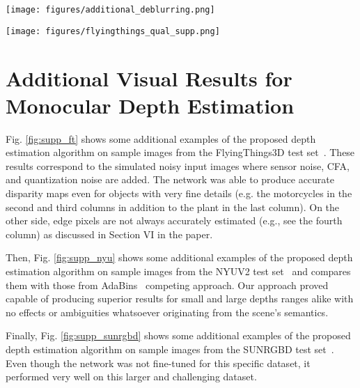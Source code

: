 \documentclass[preprint,5p,twocolumn]{elsarticle}
\begin{document}
\begin{figure*}[h!]
\centering
\texttt{[image: figures/additional\_deblurring.png]}
\caption{Additional qualitative results of the image deblurring model on the test set of FlyingThings3D~\cite{MIFDB16} subset.}
\label{fig:add_deblur_supp}
\end{figure*}



\begin{figure*}[h!]
\centering
\captionsetup{justification=centering}
\texttt{[image: figures/flyingthings\_qual\_supp.png]}
\caption{Additional qualitative results on RPSF-blurred images from the test set of FlyingThings3D~\cite{MIFDB16} subset.}
\label{fig:supp_ft}
\end{figure*}

\section{Additional Visual Results for Monocular Depth Estimation}
\label{sec:res2}


Fig. \ref{fig:supp_ft} shows some additional examples of the proposed depth estimation algorithm on  sample images from the  FlyingThings3D test set~\cite{MIFDB16}. These results correspond to the simulated noisy input images where sensor noise, CFA, and quantization noise are added. The network was able to produce accurate disparity maps even for objects with very fine details (e.g. the motorcycles in the second and third columns in addition to the plant in the last column). On the other side, edge pixels are not always accurately estimated (e.g., see the fourth column) as discussed in Section VI in the paper.

Then, Fig. \ref{fig:supp_nyu} shows some additional examples of the proposed depth estimation algorithm on  sample images from the NYUV2 test set~\cite{eigen2015predicting} and compares them with those from AdaBins~\cite{bhat2020adabins} competing approach. Our approach proved capable of producing superior results for small and large depths ranges alike with no effects or ambiguities whatsoever originating from the scene's semantics.  

Finally, Fig. \ref{fig:supp_sunrgbd} shows some additional examples of the proposed depth estimation  algorithm on sample images from the SUNRGBD test set~\cite{song2015sun}. Even though the network was not fine-tuned for this specific dataset, it performed very well on this larger  and challenging dataset. 
\end{document}
